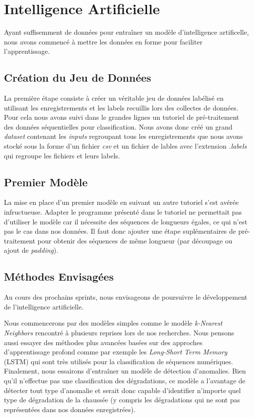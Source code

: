 \section{Intelligence Artificielle}
Ayant suffisemment de données pour entraîner un modèle d'intelligence artificelle, nous avons commencé à mettre les données en forme pour faciliter l'apprentissage.

\subsection{Création du Jeu de Données}
La première étape consiste à créer un véritable jeu de données labélisé en utilisant les enregistrements et les labels recuillis lors des collectes de données.
Pour cela nous avons suivi dans le grandes lignes un tutoriel de pré-traitement des données séquentielles pour classification.\cite{tuto_1} Nous avons donc créé un grand \textit{dataset} contenant les \textit{inputs} regroupant tous les enregistrements que nous avons stocké sous la forme d'un fichier \textit{csv} et un fichier de lables avec l'extension \textit{.labels} qui regroupe les fichiers et leurs labels.

\subsection{Premier Modèle}
La mise en place d'un premier modèle en suivant un autre tutoriel s'est avérée infructueuse. Adapter le programme présenté dans le tutoriel ne permettait pas d'utiliser le modèle car il nécessite des séquences de longueurs égales, ce qui n'est pas le cas dans nos données.\cite{tuto_2} Il faut donc ajouter une étape suplémentaires de pré-traitement pour obtenir des séquences de même longueur (par découpage ou ajout de \textit{padding}).

\subsection{Méthodes Envisagées}
Au cours des prochains sprints, nous envisageons de poursuivre le développement de l'intelligence artificielle.

Nous commencerons par des modèles simples comme le modèle \textit{k-Nearest Neighbors} rencontré à plusieurs reprises lors de nos recherches. Nous pensons aussi essayer des méthodes plus avancées basées sur des approches d'apprentissage profond comme par exemple les \textit{Long-Short Term Memory} (LSTM) qui sont très utilisés pour la classification de séquences numériques. Finalement, nous essairons d'entraîner un modèle de détection d'anomalies. Bien qu'il n'effectue pas une classification des dégradations, ce modèle a l'avantage de détecter tout type d'anomalie et serait donc capable d'identifier n'importe quel type de dégradation de la chaussée (y compris les dégradations qui ne sont pas représentées dans nos données enregistrées).

